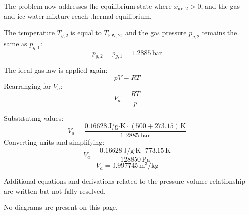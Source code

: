 The problem now addresses the equilibrium state where \( x_{\text{ice},2} > 0 \), and the gas and ice-water mixture reach thermal equilibrium.  

The temperature \( T_{g,2} \) is equal to \( T_{\text{EW},2} \), and the gas pressure \( p_{g,2} \) remains the same as \( p_{g,1} \):  
\[
p_{g,2} = p_{g,1} = 1.2885 \, \text{bar}
\]  

The ideal gas law is applied again:  
\[
p V = R T
\]  
Rearranging for \( V_a \):  
\[
V_a = \frac{R T}{p}
\]  

Substituting values:  
\[
V_a = \frac{0.16628 \, \text{J/g·K} \cdot (500 + 273.15) \, \text{K}}{1.2885 \, \text{bar}}
\]  
Converting units and simplifying:  
\[
V_a = \frac{0.16628 \, \text{J/g·K} \cdot 773.15 \, \text{K}}{128850 \, \text{Pa}}
\]  
\[
V_a = 0.997745 \, \text{m}^3/\text{kg}
\]  

Additional equations and derivations related to the pressure-volume relationship are written but not fully resolved.  

No diagrams are present on this page.